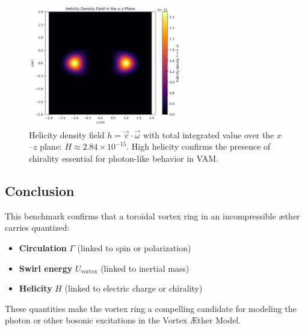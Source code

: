 \begin{figure}[H]
    \centering
    \includegraphics[width=0.6\textwidth]{images/helicity_density_integrated}
    \caption{Helicity density field $h = \vec{v} \cdot \vec{\omega}$ with total integrated value over the $x$–$z$ plane: $H \approx 2.84 \times 10^{-15}$. High helicity confirms the presence of chirality essential for photon-like behavior in VAM.}
\end{figure}

\subsection{Conclusion}

This benchmark confirms that a toroidal vortex ring in an incompressible æther carries quantized:

\begin{itemize}
    \item \textbf{Circulation} $\Gamma$ (linked to spin or polarization)
    \item \textbf{Swirl energy} $U_{\text{vortex}}$ (linked to inertial mass)
    \item \textbf{Helicity} $H$ (linked to electric charge or chirality)
\end{itemize}

These quantities make the vortex ring a compelling candidate for modeling the photon or other bosonic excitations in the Vortex Æther Model.

